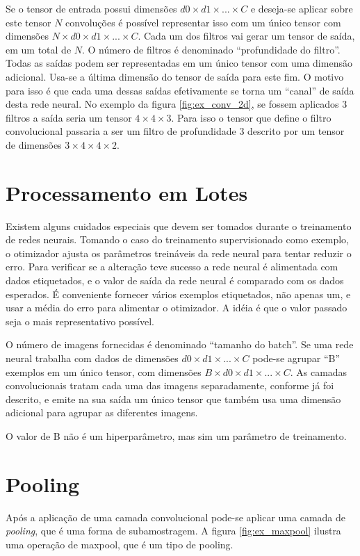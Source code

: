 Se o tensor de entrada possui dimensões $d0 \times d1 \times ... \times C$
e deseja-se aplicar sobre este
tensor $N$ convoluções é possível representar isso com um único tensor
com dimensões
$N \times d0 \times d1 \times ... \times C$. Cada um dos filtros vai gerar
um tensor de saída, em um total de $N$. O
número de filtros é denominado “profundidade do filtro”. Todas as saídas podem
ser representadas em um único tensor com uma dimensão adicional. Usa-se a última
dimensão do tensor de saída para este fim. O motivo para isso é que cada uma
dessas saídas efetivamente se torna um “canal” de saída desta rede neural. No
exemplo da figura \ref{fig:ex_conv_2d}, se fossem aplicados 3 filtros a saída
seria um tensor $4 \times 4 \times 3$. Para isso o tensor que define o filtro
convolucional passaria a ser um
filtro de profundidade 3 descrito por um tensor de dimensões
$3 \times 4 \times 4 \times 2$.

\section{Processamento em Lotes}
Existem alguns cuidados especiais que devem ser tomados durante o treinamento de
redes neurais. Tomando o caso do treinamento supervisionado como exemplo, o
otimizador ajusta os parâmetros treináveis da rede neural para tentar reduzir o
erro. Para verificar se a alteração teve sucesso a rede neural é alimentada com
dados etiquetados, e o valor de saída da rede neural é comparado com os dados
esperados. É conveniente fornecer vários exemplos etiquetados, não apenas um, e
usar a média do erro para alimentar o otimizador. A idéia é que o valor passado
seja o mais representativo possível.

O número de imagens fornecidas é denominado “tamanho do batch”. Se uma rede
neural trabalha com dados de dimensões $d0 \times d1 \times ... \times C$
pode-se agrupar “B” exemplos em
um único tensor, com dimensões $B \times d0 \times d1 \times ... \times C$.
As camadas convolucionais tratam cada
uma das imagens separadamente, conforme já foi descrito, e emite na sua saída um
único tensor que também usa uma dimensão adicional para agrupar as diferentes
imagens.

O valor de B não é um hiperparâmetro, mas sim um parâmetro de treinamento.

\section{Pooling}
Após a aplicação de uma camada convolucional pode-se aplicar uma camada de
\emph{pooling}, que é uma forma de subamostragem. A figura
\ref{fig:ex_maxpool} ilustra uma operação de maxpool, que é um tipo de
pooling.

